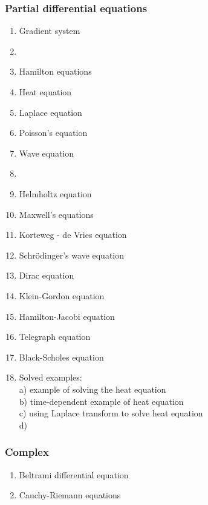 \documentclass[12pt]{article}
\begin{document}
\subsubsection*{Partial differential equations}
\begin{enumerate}
\item Gradient system 
\item {}
\item Hamilton equations
\item Heat equation 
\item Laplace equation
\item Poisson's equation
\item Wave equation
\item {}
\item Helmholtz equation 
\item Maxwell's equations
\item Korteweg - de Vries equation 
\item Schr\"odinger's wave equation
\item Dirac equation
\item Klein-Gordon equation
\item Hamilton-Jacobi equation
\item Telegraph equation
\item Black-Scholes equation
\item Solved examples:\\
a) example of solving the heat equation\\
b) time-dependent example of heat equation\\
c) using Laplace transform to solve heat equation\\
d) 
\end{enumerate}


\subsubsection*{Complex}
\begin{enumerate}
\item Beltrami differential equation
\item Cauchy-Riemann equations
\end{enumerate}
\end{document}
